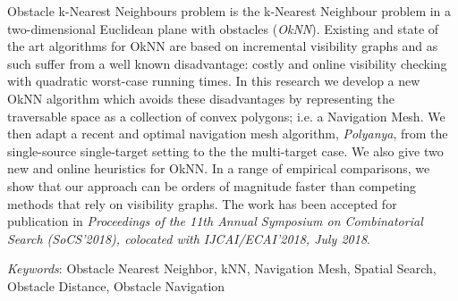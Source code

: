 Obstacle k-Nearest Neighbours problem is the k-Nearest Neighbour problem in a 
two-dimensional Euclidean plane with obstacles (\emph{OkNN}).
Existing and state of the art algorithms for OkNN are based on incremental 
visibility graphs and as such suffer from a well known disadvantage: costly 
and online visibility checking with quadratic worst-case running times.
In this research we develop a new OkNN algorithm which avoids these disadvantages
by representing the traversable space as a collection of convex polygons; i.e.
a Navigation Mesh. 
We then adapt a recent and optimal navigation mesh algorithm, \textit{Polyanya}, from the
single-source single-target setting to the the multi-target case. 
We also give two new and online heuristics for OkNN.
In a range of empirical comparisons, we show that our approach can be orders of magnitude faster than competing methods that rely on visibility graphs.
The work has been accepted for publication in \textit{Proceedings of the 11th Annual Symposium on Combinatorial Search (SoCS’2018), colocated with
IJCAI/ECAI’2018, July 2018}.

\textit{Keywords}: Obstacle Nearest Neighbor, kNN, Navigation Mesh, Spatial Search, Obstacle
Distance, Obstacle Navigation
